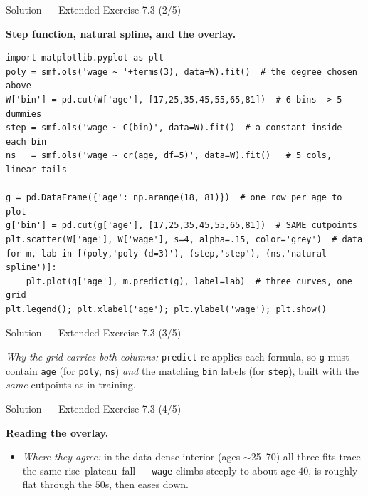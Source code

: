 \documentclass[aspectratio=169,11pt]{beamer}
\begin{document}
\begin{frame}[fragile]{Solution --- Extended Exercise 7.3 (2/5)}
\begin{solutionbox}
\textbf{Step function, natural spline, and the overlay.}
\begin{lstlisting}[basicstyle=\ttfamily\scriptsize]
import matplotlib.pyplot as plt
poly = smf.ols('wage ~ '+terms(3), data=W).fit()  # the degree chosen above
W['bin'] = pd.cut(W['age'], [17,25,35,45,55,65,81])  # 6 bins -> 5 dummies
step = smf.ols('wage ~ C(bin)', data=W).fit()  # a constant inside each bin
ns   = smf.ols('wage ~ cr(age, df=5)', data=W).fit()   # 5 cols, linear tails

g = pd.DataFrame({'age': np.arange(18, 81)})  # one row per age to plot
g['bin'] = pd.cut(g['age'], [17,25,35,45,55,65,81])  # SAME cutpoints
plt.scatter(W['age'], W['wage'], s=4, alpha=.15, color='grey')  # data
for m, lab in [(poly,'poly (d=3)'), (step,'step'), (ns,'natural spline')]:
    plt.plot(g['age'], m.predict(g), label=lab)  # three curves, one grid
plt.legend(); plt.xlabel('age'); plt.ylabel('wage'); plt.show()
\end{lstlisting}
\end{solutionbox}
\end{frame}

\begin{frame}{Solution --- Extended Exercise 7.3 (3/5)}
\begin{solutionbox}
\emph{Why the grid carries both columns:} \texttt{predict} re-applies each formula, so \texttt{g} must contain \texttt{age} (for \texttt{poly}, \texttt{ns}) \emph{and} the matching \texttt{bin} labels (for \texttt{step}), built with the \emph{same} cutpoints as in training.
\end{solutionbox}
\end{frame}

\begin{frame}{Solution --- Extended Exercise 7.3 (4/5)}
\begin{solutionbox}
\textbf{Reading the overlay.}
\begin{itemize}
  \item \emph{Where they agree:} in the data-dense interior (ages $\sim$25--70) all three fits trace the same rise--plateau--fall --- \texttt{wage} climbs steeply to about age $40$, is roughly flat through the $50$s, then eases down.
  \end{itemize}
\end{solutionbox}
\end{frame}
\end{document}
